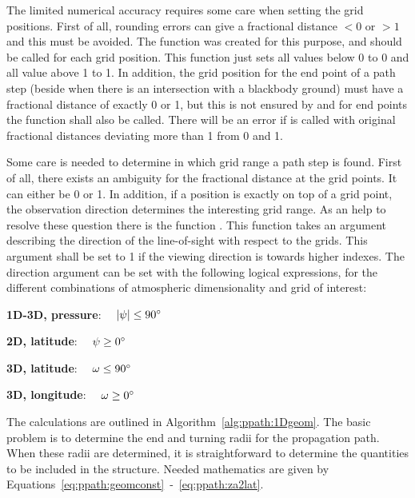 The limited numerical accuracy requires some care when setting the
grid positions. First of all, rounding errors can give a fractional
distance $< 0$ or $> 1$ and this must be avoided. The function
 was created for this purpose, and
should be called for each grid position. This function just
sets all values below 0 to 0 and all value above 1 to 1. In addition,
the grid position for the end point of a path step (beside when there
is an intersection with a blackbody ground) must have a fractional
distance of exactly 0 or 1, but this is not ensured by
 and for end points the function
 shall also be called. There will
be an error if  is called with
original fractional distances deviating more than 1
from 0 and 1.

Some care is needed to determine in which grid range a path step is
found. First of all, there exists an ambiguity for the fractional
distance at the grid points. It can either be 0 or 1. In addition, if
a position is exactly on top of a grid point, the observation
direction determines the interesting grid range. As an help to resolve
these question there is the function .
This function takes an argument describing the direction of the
line-of-sight with respect to the grids. This argument shall be set to
1 if the viewing direction is towards higher indexes. The direction
argument can be set with the following logical expressions, for the
different combinations of atmospheric dimensionality and grid of
interest:

 {\bf 1D-3D, pressure}: $\quad |\psi| \leq 90^\circ$

 {\bf 2D, latitude}: $\quad \psi \geq 0^\circ$

 {\bf 3D, latitude}: $\quad \omega \leq 90^\circ$

 {\bf 3D, longitude}: $\quad \omega \geq 0^\circ$


\label{sec:ppath:1Dwithout}

The calculations are outlined in Algorithm~\ref{alg:ppath:1Dgeom}. The
basic problem is to determine the end and turning radii for the
propagation path. When these radii are determined, it is
straightforward to determine the quantities to be included in the
 structure. Needed mathematics are given by
Equations~\ref{eq:ppath:geomconst}~-~\ref{eq:ppath:za2lat}.

